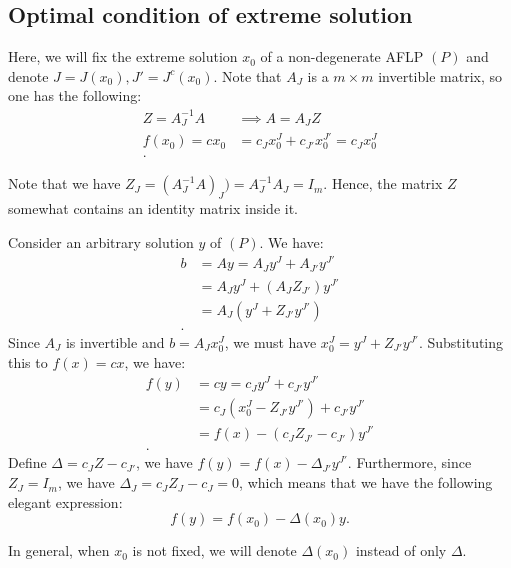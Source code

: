 
\subsection{Optimal condition of extreme solution} %
\label{sub:Optimal condition of extreme solution}

Here, we will fix the extreme solution \( x_{0} \) of a non-degenerate AFLP \(
(P) \) and denote \( J = J(x_{0}), J' = J^{c}(x_{0}) \). Note that \( A_{J} \)
is a \( m\times m \) invertible matrix, so one has the following:
\begin{align*}
  Z = A_{J}^{-1}A &\implies A = A_{J}Z\\
  f(x_{0}) = cx_{0} &= c_{J}x_{0}^{J} + c_{J'}x_{0}^{J'} = c_{J}x_{0}^{J}\\
.\end{align*}

Note that we have \( Z_{J} = (A^{-1}_{J}A)_{J}) = A^{-1}_{J}A_{J} = I_{m} \).
Hence, the matrix \( Z \) somewhat contains an identity matrix inside it.

Consider an arbitrary solution \( y \) of \( (P) \). We have:
\begin{align*}
  b &=  Ay = A_{J}y^{J} + A_{J'}y^{J'} \\
  &= A_{J}y^{J} + (A_{J}Z_{J'})y^{J'} \\
  &= A_{J}(y^{J} + Z_{J'}y^{J'}) \\
.\end{align*}
Since \( A_{J} \) is invertible and \( b = A_{J}x_{0}^{J} \), we must have \(
x_{0}^{J}
= y^{J}+ Z_{J'}y^{J'}\). Substituting this to \( f(x) = cx \), we have:
\begin{align*}
  f(y) &=  cy = c_{J}y^{J} + c_{J'}y^{J'} \\
  &= c_{J}(x_{0}^{J} - Z_{J'}y^{J'}) + c_{J'}y^{J'} \\
  &= f(x) - (c_{J}Z_{J'} - c_{J'})y^{J'} \\
.\end{align*}
Define \( \Delta = c_{J}Z - c_{J'} \), we have \( f(y) = f(x) -
\Delta_{J'}y^{J'} \). Furthermore, since \( Z_{J} = I_{m} \), we have \(
\Delta_{J} = c_{J}Z_{J} - c_{J} = 0 \), which means that we have the following
elegant expression:
\[
  f(y) = f(x_{0}) - \Delta(x_{0}) y
.\] 

In general, when \( x_{0} \) is not fixed, we will denote \( \Delta(x_{0}) \)
instead of only \( \Delta \).

